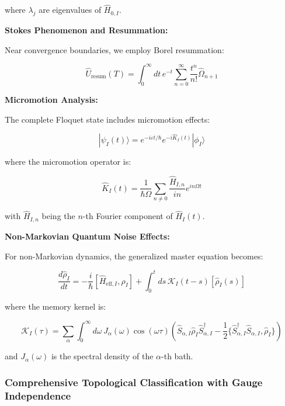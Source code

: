 \documentclass[11pt]{article}
\begin{document}
where $\lambda_j$ are eigenvalues of $\hat{H}_{0,I}$.

\textbf{Stokes Phenomenon and Resummation:}

Near convergence boundaries, we employ Borel resummation:

\begin{equation}
\hat{U}_{\text{resum}}(T) = \int_0^{\infty} dt \, e^{-t} \sum_{n=0}^{\infty} \frac{t^n}{n!} \hat{\Omega}_{n+1}
\end{equation}

\textbf{Micromotion Analysis:}

The complete Floquet state includes micromotion effects:

\begin{equation}
|\psi_I(t)\rangle = e^{-i\varepsilon t/\hbar} e^{-i\hat{K}_I(t)} |\phi_I\rangle
\end{equation}

where the micromotion operator is:

\begin{equation}
\hat{K}_I(t) = \frac{1}{\hbar\Omega} \sum_{n \neq 0} \frac{\hat{H}_{I,n}}{in} e^{in\Omega t}
\end{equation}

with $\hat{H}_{I,n}$ being the $n$-th Fourier component of $\hat{H}_I(t)$.

\textbf{Non-Markovian Quantum Noise Effects:}

For non-Markovian dynamics, the generalized master equation becomes:

\begin{equation}
\frac{d\hat{\rho}_I}{dt} = -\frac{i}{\hbar}[\hat{H}_{\text{eff},I}, \hat{\rho}_I] + \int_0^t ds \, \mathcal{K}_I(t-s)[\hat{\rho}_I(s)]
\end{equation}

where the memory kernel is:

\begin{equation}
\mathcal{K}_I(\tau) = \sum_{\alpha} \int_0^{\infty} d\omega \, J_{\alpha}(\omega) \cos(\omega\tau) \left( \hat{S}_{\alpha,I} \hat{\rho}_I \hat{S}_{\alpha,I}^{\dagger} - \frac{1}{2}\{\hat{S}_{\alpha,I}^{\dagger} \hat{S}_{\alpha,I}, \hat{\rho}_I\} \right)
\end{equation}

and $J_{\alpha}(\omega)$ is the spectral density of the $\alpha$-th bath.

\subsubsection{Comprehensive Topological Classification with Gauge Independence}
\end{document}
